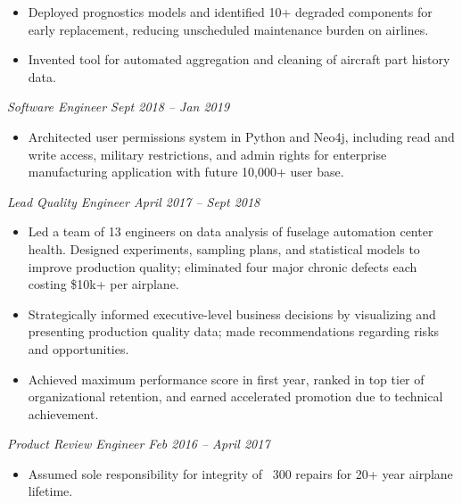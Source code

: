 \documentclass[10pt,letterpaper]{article}
\begin{document}
            \begin{itemize}[label={--}, leftmargin=.5in, labelindent=16pt, topsep=1pt]
                \setlength\itemsep{-.25em}
            	\item Deployed prognostics models and identified 10+ degraded components for early replacement, reducing unscheduled maintenance burden on airlines.
            	\item Invented tool for automated aggregation and cleaning of aircraft part history data.
            \end{itemize}

        \quad \emph{Software Engineer \hfill Sept 2018 – Jan 2019}

            \begin{itemize}[label={--}, leftmargin=.5in, labelindent=16pt, topsep=1pt]
                \setlength\itemsep{-.25em}
            	\item Architected user permissions system in Python and Neo4j, including read and write access, military restrictions, and admin rights for enterprise manufacturing application with future 10,000+ user base.
            \end{itemize}

        \quad \emph{Lead Quality Engineer \hfill April 2017 – Sept 2018}

            \begin{itemize}[label={--}, leftmargin=.5in, labelindent=16pt, topsep=1pt]
                \setlength\itemsep{-.25em}
            	\item Led a team of 13 engineers on data analysis of fuselage automation center health. Designed experiments, sampling plans, and statistical models to improve production quality; eliminated four major chronic defects each costing \$10k+ per airplane.
            	\item Strategically informed executive-level business decisions by visualizing and presenting production quality data; made recommendations regarding risks and opportunities.
            	\item Achieved maximum performance score in first year, ranked in top tier of organizational retention, and earned accelerated promotion due to technical achievement.
            \end{itemize}

        \quad \emph{Product Review Engineer \hfill Feb 2016 – April 2017}

            \begin{itemize}[label={--}, leftmargin=.5in, labelindent=16pt, topsep=1pt]
            \setlength\itemsep{-.25em}
            	\item Assumed sole responsibility for integrity of ~300 repairs for 20+ year airplane lifetime.
            \end{itemize}
\end{document}
